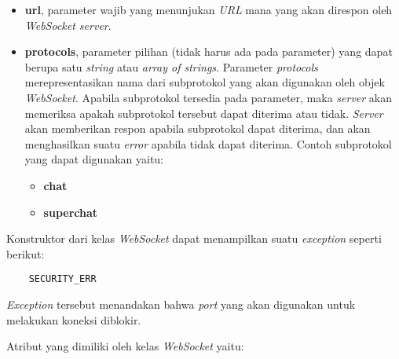 \begin{itemize}
	\item \textbf{url}, parameter wajib yang menunjukan \textit{URL} mana yang akan direspon oleh \textit{WebSocket server}.
	
	\item \textbf{protocols}, parameter pilihan (tidak harus ada pada parameter) yang dapat berupa satu \textit{string} atau \textit{array of strings}. Parameter \textit{protocols} merepresentasikan nama dari subprotokol yang akan digunakan oleh objek \textit{WebSocket}. Apabila subprotokol tersedia pada parameter, maka \textit{server} akan memeriksa apakah subprotokol tersebut dapat diterima atau tidak. \textit{Server} akan memberikan respon apabila subprotokol dapat diterima, dan akan menghasilkan suatu \textit{error} apabila tidak dapat diterima. Contoh subprotokol yang dapat digunakan yaitu:
	\begin{itemize}
		\item \textbf{chat}
		\item \textbf{superchat}
	\end{itemize}
	
\end{itemize}

Konstruktor dari kelas \textit{WebSocket} dapat menampilkan suatu \textit{exception} seperti berikut:

\begin{lstlisting}
	SECURITY_ERR
\end{lstlisting}

\textit{Exception} tersebut menandakan bahwa \textit{port} yang akan digunakan untuk melakukan koneksi diblokir.

Atribut yang dimiliki oleh kelas \textit{WebSocket} yaitu:

